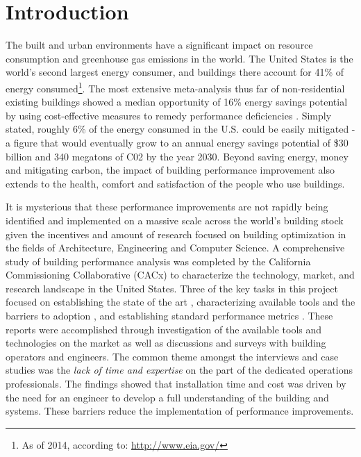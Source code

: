\chapter{Introduction}
\label{sec:intro}
The built and urban environments have a significant impact on resource consumption and greenhouse gas emissions in the world. The United States is the world's second largest energy consumer, and buildings there account for 41\% of energy consumed\footnote{As of 2014, according to: \url{http://www.eia.gov/}}. The most extensive meta-analysis thus far of non-residential existing buildings showed a median opportunity of 16\% energy savings potential by using cost-effective measures to remedy performance deficiencies \citep{mills_building_2011}. Simply stated, roughly 6\% of the energy consumed in the U.S. could be easily mitigated - a figure that would eventually grow to an annual energy savings potential of \$30 billion and 340 megatons of C02 by the year 2030. Beyond saving energy, money and mitigating carbon, the impact of building performance improvement also extends to the health, comfort and satisfaction of the people who use buildings.

It is mysterious that these performance improvements are not rapidly being identified and implemented on a massive scale across the world’s building stock given the incentives and amount of research focused on building optimization in the fields of Architecture, Engineering and Computer Science. A comprehensive study of building performance analysis was completed by the California Commissioning Collaborative (CACx) to characterize the technology, market, and research landscape in the United States. Three of the key tasks in this project focused on establishing the state of the art \citep{effinger_building_2010}, characterizing available tools and the barriers to adoption \citep{ulickey_building_2010}, and establishing standard performance metrics \citep{greensfelder_building_2010}. These reports were accomplished through investigation of the available tools and technologies on the market as well as discussions and surveys with building operators and engineers. The common theme amongst the interviews and case studies was the \emph{lack of time and expertise} on the part of the dedicated operations professionals. The findings showed that installation time and cost was driven by the need for an engineer to develop a full understanding of the building and systems. These barriers reduce the implementation of performance improvements.



